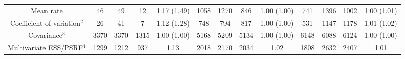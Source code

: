 \begin{sidewaystable}[!ht]
\begin{center}
\begin{tabular}{ccccc|cccc|cccc}
Mean rate                & 46      & 49      & 12      & 1.17 (1.49) & 1058    & 1270    & 846     & 1.00 (1.00) & 741     & 1396    & 1002    & 1.00 (1.01) \\
Coefficient of variation$^2$ & 26      & 41      & 7       & 1.12 (1.28) & 748     & 794     & 817     & 1.00 (1.00) & 531     & 1147    & 1178    & 1.01 (1.02) \\
Covariance$^3$               & 3370    & 3370    & 1315    & 1.00 (1.00) & 5168    & 5209    & 5134    & 1.00 (1.00) & 6148    & 6088    & 6124    & 1.00 (1.00) \\
Multivariate ESS/PSRF$^4$    & 1299    & 1212    & 937     & 1.13        & 2018    & 2170    & 2034    & 1.02        & 1808    & 2632    & 2407    & 1.01       \\
\bottomrule
\end{tabular}
\end{center}
\end{sidewaystable}

